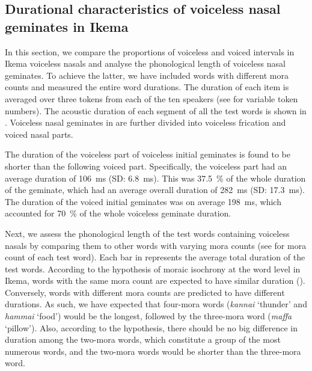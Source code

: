 \documentclass[output=paper]{langscibook}
\begin{document}
\subsection{Durational characteristics of voiceless nasal geminates in Ikema}
\label{sec:shinohara:4.2}
In this section, we compare the proportions of voiceless and voiced intervals in Ikema voiceless nasals and analyse the phonological length of voiceless nasal geminates. To achieve the latter, we have included words with different mora counts and measured the entire word durations. The duration of each item is averaged over three tokens from each of the ten speakers (see  for variable token numbers). The acoustic duration of each segment of all the test words is shown in . Voiceless nasal geminates in  are further divided into voiceless frication and voiced nasal parts.

The duration of the voiceless part of voiceless initial geminates is found to be shorter than the following voiced part. Specifically, the voiceless part had an average duration of 106~ms (SD: 6.8~ms). This was 37.5~\% of the whole duration of the geminate, which had an average overall duration of 282~ms (SD: 17.3~ms). The duration of the voiced initial geminates was on average 198~ms, which accounted for 70~\% of the whole voiceless geminate duration. 

Next, we assess the phonological length of the test words containing voiceless nasals by comparing them to other words with varying mora counts (see  for mora count of each test word). Each bar in  represents the average total duration of the test words. According to the hypothesis of moraic isochrony at the word level in Ikema, words with the same mora count are expected to have similar duration (\citealt{ShinoharaFujimoto2018}). Conversely, words with different mora counts are predicted to have different durations. As such, we have expected that four-mora words (\textit{kannai} ‘thunder’ and \textit{hammai} ‘food’) would be the longest, followed by the three-mora word (\textit{maffa} ‘pillow’). Also, according to the hypothesis, there should be no big difference in duration among the two-mora words, which constitute a group of the most numerous words, and the two-mora words would be shorter than the three-mora word.
\end{document}
